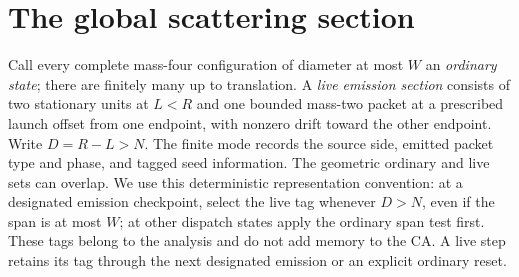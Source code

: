 \documentclass[11pt,letterpaper]{article}
\numberwithin{equation}{section}
\theoremstyle{definition}
\theoremstyle{remark}
\begin{document}
\section{The global scattering section}\label{smc:fm:sec:scattering}
Call every complete mass-four configuration of diameter at most $W$ an
\emph{ordinary state}; there are finitely many up to translation.
A \emph{live emission section} consists of two stationary units at $L<R$ and
one bounded mass-two packet at a prescribed launch offset from one endpoint,
with nonzero drift toward the other endpoint. Write $D=R-L>N$. The finite
mode records the source side, emitted packet type and phase, and tagged seed
information. The geometric ordinary and live sets can overlap. We use this
deterministic representation convention: at a designated emission checkpoint,
select the live tag whenever $D>N$, even if the span is at most $W$; at other
dispatch states apply the ordinary span test first. These tags belong to the
analysis and do not add memory to the CA. A live step retains its tag through
the next designated emission or an explicit ordinary reset.
\end{document}
